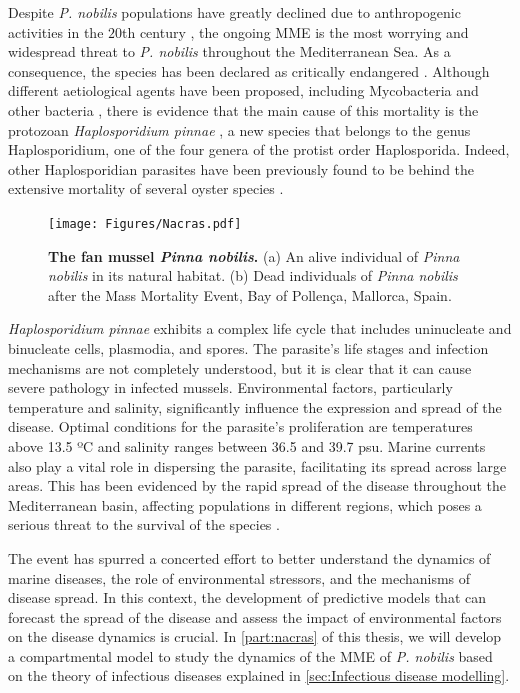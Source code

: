Despite \textit{P. nobilis} populations have greatly declined due to
anthropogenic activities in the $20$th century \cite{VAZQUEZ2017}, the
ongoing
MME is the most worrying and widespread threat to \textit{P. nobilis}
throughout the Mediterranean Sea. As a consequence, the species has been
declared as critically endangered \cite{IUCN}. Although different
aetiological
agents have been proposed, including Mycobacteria and other bacteria
\cite{Carella2019, Saric2020, Scarpa2020}, there is evidence that the main
cause of this mortality is the protozoan \textit{Haplosporidium pinnae}
\cite{DARRIBA201714, CATANESE20189, Box2020}, a new species that belongs to
the genus Haplosporidium, one of the four genera of the protist order
Haplosporida. Indeed, other Haplosporidian parasites have been previously
found
to be behind the extensive mortality of several oyster species
\cite{Burreson2004, Arzul2015}.

\begin{figure}[H]
  \centering
  \texttt{[image: Figures/Nacras.pdf]}
  \caption[The fan mussel \textit{Pinna nobilis}]{
    \textbf{The fan mussel \textit{Pinna nobilis}.} (a) An alive individual
    of
    \textit{Pinna nobilis} in its natural habitat. (b) Dead individuals of
    \textit{Pinna nobilis} after the Mass Mortality Event, Bay of Pollença,
    Mallorca, Spain.}
  \label{fig:Pinna_nobilis}
\end{figure}

\textit{Haplosporidium pinnae} exhibits a complex life cycle that includes
uninucleate and binucleate cells, plasmodia, and spores. The parasite's life
stages and infection mechanisms are not completely understood, but it is
clear
that it can cause severe pathology in infected mussels. Environmental
factors,
particularly temperature and salinity, significantly influence the expression
and spread of the disease. Optimal conditions for the parasite's
proliferation
are temperatures above 13.5 ºC and salinity ranges between 36.5 and 39.7 psu.
Marine currents also play a vital role in dispersing the parasite,
facilitating
its spread across large areas. This has been evidenced by the rapid spread of
the disease throughout the Mediterranean basin, affecting populations in
different regions, which poses a serious threat to the survival of the
species
\cite{Cabanellas2019}.

The event has spurred a concerted effort to better understand the dynamics of
marine diseases, the role of environmental stressors, and the mechanisms of
disease spread. In this context, the development of predictive models that
can
forecast the spread of the disease and assess the impact of environmental
factors on the disease dynamics is crucial. In \cref{part:nacras} of this
thesis, we will develop a compartmental model to study the dynamics of the MME
of \textit{P. nobilis} based on the theory of infectious diseases explained
in
\cref{sec:Infectious disease modelling}.

